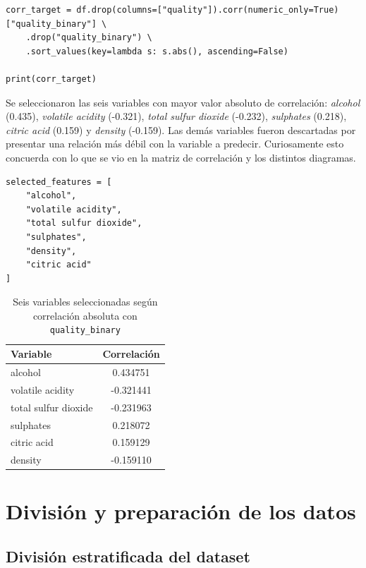 \documentclass[conference]{IEEEtran}
\begin{document}
\begin{lstlisting}[caption={Búsqueda de variables con mayor correlación}, label={lst:corrtarget}]
corr_target = df.drop(columns=["quality"]).corr(numeric_only=True)["quality_binary"] \
    .drop("quality_binary") \
    .sort_values(key=lambda s: s.abs(), ascending=False)

print(corr_target)
\end{lstlisting}

Se seleccionaron las seis variables con mayor valor absoluto de correlación: \textit{alcohol} (0.435), \textit{volatile acidity} (-0.321), \textit{total sulfur dioxide} (-0.232), \textit{sulphates} (0.218), \textit{citric acid} (0.159) y \textit{density} (-0.159). Las demás variables fueron descartadas por presentar una relación más débil con la variable a predecir. Curiosamente esto concuerda con lo que se vio en la matriz de correlación y los distintos diagramas.

\begin{lstlisting}[caption={Selección final de las seis características}, label={lst:features}]
selected_features = [
    "alcohol",
    "volatile acidity",
    "total sulfur dioxide",
    "sulphates",
    "density",
    "citric acid"
]
\end{lstlisting}

\begin{table}[H]
\centering
\caption{Seis variables seleccionadas según correlación absoluta con \texttt{quality\_binary}}
\label{tab:features}
\begin{tabular}{lc}
\toprule
Variable & Correlación \\
\midrule
alcohol & 0.434751 \\
volatile acidity & -0.321441 \\
total sulfur dioxide & -0.231963 \\
sulphates & 0.218072 \\
citric acid & 0.159129 \\
density & -0.159110 \\
\bottomrule
\end{tabular}
\end{table}

\section{División y preparación de los datos}

\subsection{División estratificada del dataset}
\end{document}
